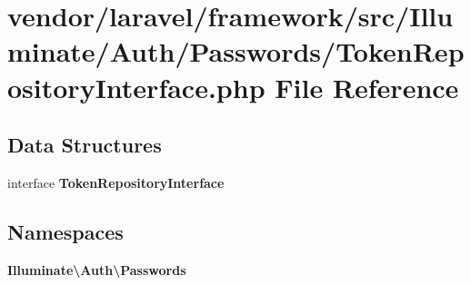 \section{vendor/laravel/framework/src/\+Illuminate/\+Auth/\+Passwords/\+Token\+Repository\+Interface.php File Reference}
\label{_token_repository_interface_8php}
\subsection*{Data Structures}
\begin{DoxyCompactItemize}
\item 
interface {\bf Token\+Repository\+Interface}
\end{DoxyCompactItemize}
\subsection*{Namespaces}
\begin{DoxyCompactItemize}
\item 
 {\bf Illuminate\textbackslash{}\+Auth\textbackslash{}\+Passwords}
\end{DoxyCompactItemize}
